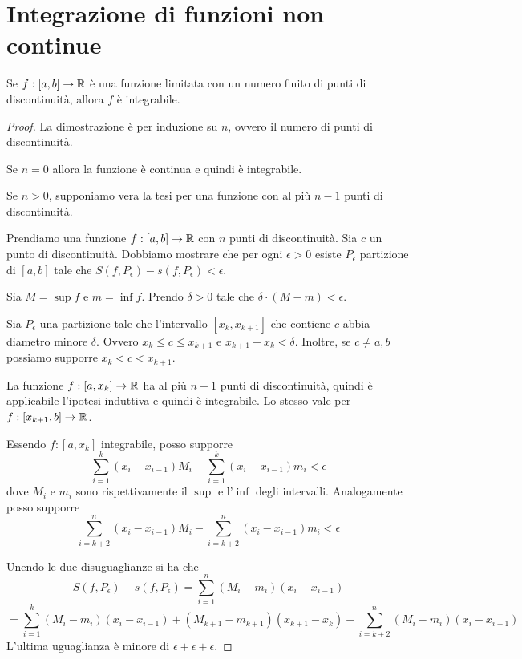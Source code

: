 \section{Integrazione di funzioni non continue}

\begin{theorem}
Se $f:[a,b] \to \mathbb R$ è una funzione limitata con un numero finito di punti di discontinuità, allora $f$ è integrabile.
\end{theorem}

\begin{proof}
La dimostrazione è per induzione su $n$, ovvero il numero di punti di discontinuità.

Se $n = 0$ allora la funzione è continua e quindi è integrabile.

Se $n > 0$, supponiamo vera la tesi per una funzione con al più $n-1$ punti di discontinuità. 

Prendiamo una funzione $f:[a,b] \to \mathbb R$ con $n$ punti di discontinuità. Sia $c$ un punto di discontinuità. Dobbiamo mostrare che per ogni $\epsilon > 0$ esiste $P_\epsilon$ partizione di $[a,b]$ tale che $S(f, P_\epsilon)-s(f,P_\epsilon) < \epsilon$.

Sia $M = \sup f$ e $m = \inf f$. Prendo $\delta > 0$ tale che $\delta \cdot (M - m) < \epsilon$.

Sia $P_\epsilon$ una partizione tale che l'intervallo $[x_k, x_{k+1}]$ che contiene $c$ abbia diametro minore $\delta$. Ovvero $x_k \le c \le x_{k+1}$ e $x_{k+1}-x_k < \delta$. Inoltre, se $c \neq a, b$ possiamo supporre $x_k < c < x_{k+1}$.

La funzione $f:[a, x_k] \to \mathbb R$ ha al più $n-1$ punti di discontinuità, quindi è applicabile l'ipotesi induttiva e quindi è integrabile. Lo stesso vale per $f:[x_{k+1}, b] \to \mathbb R$.

Essendo $f:[a, x_k]$ integrabile, posso supporre
\begin{equation*}
\sum_{i=1}^k (x_i - x_{i-1}) M_i - \sum_{i=1}^k (x_i - x_{i-1}) m_i < \epsilon
\end{equation*}
dove $M_i$ e $m_i$ sono rispettivamente il $\sup$ e l'$\inf$ degli intervalli. Analogamente posso supporre
\begin{equation*}
\sum_{i=k+2}^n (x_i - x_{i-1}) M_i - \sum_{i=k+2}^n (x_i - x_{i-1}) m_i < \epsilon
\end{equation*}

Unendo le due disuguaglianze si ha che
\begin{equation*}
S(f,P_\epsilon)-s(f,P_\epsilon) = \sum_{i=1}^n (M_i-m_i)(x_i-x_{i-1})
\end{equation*}
\begin{equation*}
= \sum_{i=1}^k (M_i-m_i)(x_i-x_{i-1}) + (M_{k+1}-m_{k+1})(x_{k+1}-x_k) + \sum_{i=k+2}^n (M_i-m_i)(x_i-x_{i-1})
\end{equation*}
L'ultima uguaglianza è minore di $\epsilon + \epsilon + \epsilon$.


\end{proof}
